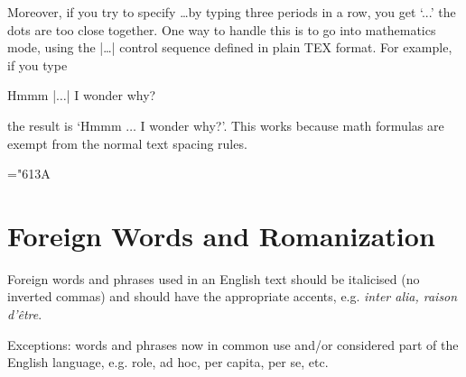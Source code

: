 Moreover, if you try to specify \ldots by typing three periods in a row,
you get `...' the dots are too close together. One way to handle this is to go
into mathematics mode, using the |\ldots| control sequence defined in plain TEX
format. For example, if you type

Hmmm |$\ldots$| I wonder why?

the result is `Hmmm $\ldots$ I wonder why?'. This works because math formulas are
exempt from the normal text spacing rules.


\begin{teXXX}
\mathchardef\ldotp="613A %
\def\ldots{\mathinner{\ldotp\ldotp\ldotp}}
\end{teXXX}




\section{Foreign Words and Romanization}

Foreign words and phrases used in an English text should be italicised (no
inverted commas) and should have the appropriate accents, e.g. \textit{inter alia,
raison d'\^{e}tre}.

Exceptions: words and phrases now in common use and/or considered part of
the English language, e.g. role, ad hoc, per capita, per se, etc.

